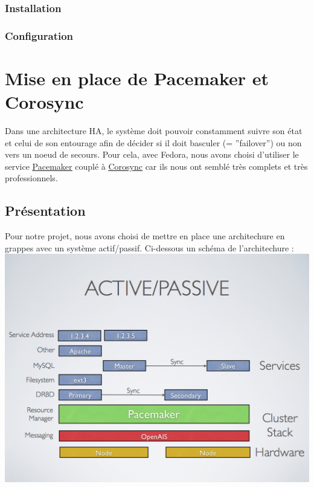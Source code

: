 \documentclass[11pt,a4paper]{report}
\begin{document}
		\subsubsection{Installation}



		\subsubsection{Configuration}

        \section{Mise en place de Pacemaker et Corosync}
            
            Dans une architecture HA, le système doit pouvoir constamment suivre son état et celui de son entourage afin de décider si il doit basculer (= ''failover'') ou non vers un noeud de secours. Pour cela, avec Fedora, nous avons choisi d'utiliser le service \underline{\href{http://clusterlabs.org}{Pacemaker}} couplé à \underline{\href{http://www.corosync.org}{Corosync}} car ils nous ont semblé très complets et très professionnels.
            
            \subsection{Présentation}
                
                Pour notre projet, nous avons choisi de mettre en place une architechure en grappes avec un système actif/passif. Ci-dessous un schéma de l'architechure :\\
                
                \includegraphics[keepaspectratio=true, width=\textwidth]{content/pacemaker-active-passive.png}\\[1cm]
                
\end{document}
